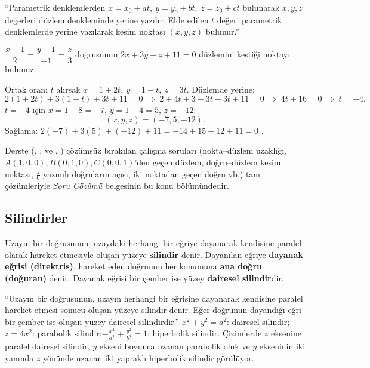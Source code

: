 \begin{tahta}
``Parametrik denklemlerden $x=x_0+at,\ y=y_0+bt,\ z=z_0+ct$ bulunarak $x,y,z$ değerleri düzlem denkleminde yerine yazılır. Elde edilen $t$ değeri parametrik denklemlerde yerine yazılarak kesim noktası $(x,y,z)$ bulunur.''
\end{tahta}

\begin{soru}
$\dfrac{x-1}{2}=\dfrac{y-1}{-1}=\dfrac{z}{3}$ doğrusunun $2x+3y+z+11=0$ düzlemini kestiği noktayı bulunuz.
\end{soru}
\begin{cevap}
Ortak oranı $t$ alırsak $x=1+2t,\ y=1-t,\ z=3t$. Düzlemde yerine:
\[ 2(1+2t)+3(1-t)+3t+11=0\ \Rightarrow\ 2+4t+3-3t+3t+11=0\ \Rightarrow\ 4t+16=0\ \Rightarrow\ t=-4 . \]
$t=-4$ için $x=1-8=-7$, $y=1+4=5$, $z=-12$:
\[ \boxed{(x,y,z)=(-7,5,-12)}. \]
Sağlama: $2(-7)+3(5)+(-12)+11=-14+15-12+11=0$ \checkmark.
\end{cevap}

\begin{bilgi}
Derste (, ,  ve , ) çözümsüz bırakılan çalışma soruları (nokta--düzlem uzaklığı, $A(1,0,0),B(0,1,0),C(0,0,1)$'den geçen düzlem, doğru--düzlem kesim noktası, $\frac{z}{0}$ yazımlı doğruların açısı, iki noktadan geçen doğru vb.) tam çözümleriyle \emph{Soru Çözümü} belgesinin bu konu bölümündedir.
\end{bilgi}

\subsection{Silindirler}

\begin{tanim}[Silindir]
Uzayın bir doğrusunun, uzaydaki herhangi bir eğriye dayanarak kendisine paralel olarak hareket etmesiyle oluşan yüzeye \textbf{silindir} denir. Dayanılan eğriye \textbf{dayanak eğrisi (direktris)}, hareket eden doğrunun her konumuna \textbf{ana doğru (doğuran)} denir. Dayanak eğrisi bir çember ise yüzey \textbf{dairesel silindir}dir.
\end{tanim}

\begin{tahta}
``Uzayın bir doğrusunun, uzayın herhangi bir eğrisine dayanarak kendisine paralel hareket etmesi sonucu oluşan yüzeye silindir denir. Eğer doğrunun dayandığı eğri bir çember ise oluşan yüzey dairesel silindirdir.''
$x^2+y^2=a^2$: dairesel silindir;\quad $z=4x^2$: parabolik silindir;\quad $-\frac{x^2}{a^2}+\frac{y^2}{b^2}=1$: hiperbolik silindir.
Çizimlerde $z$ eksenine paralel dairesel silindir, $y$ ekseni boyunca uzanan parabolik oluk ve $y$ ekseninin iki yanında $z$ yönünde uzanan iki yapraklı hiperbolik silindir görülüyor.
\end{tahta}

